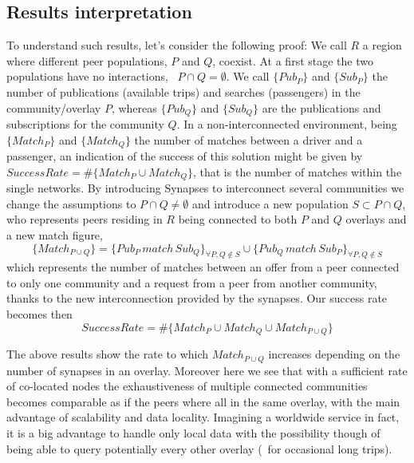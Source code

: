 \subsection{Results interpretation}
%
To understand such results, let's consider the following proof: We
call $R$ a region where different peer populations, $P$ and $Q$,
coexist.  At a first stage the two populations have no interactions,
\ie\ $P \cap Q = \emptyset$.  We call $\{ Pub_{P} \}$ and $\{ Sub_{P}
\}$ the number of publications (available trips) and searches
(passengers) in the community/overlay $P$, whereas $\{ Pub_{Q} \}$ and
$\{ Sub_{Q} \}$ are the publications and subscriptions for the
community $Q$.  In a non-interconnected environment, being $\{
Match_{P} \}$ and $\{ Match_{Q} \}$ the number of matches between a
driver and a passenger, an indication of the success of this solution
might be given by $SuccessRate = \# \{ Match_{P} \cup Match_{Q} \}$,
that is the number of matches within the single networks.  By
introducing Synapses to interconnect several communities we change the
assumptions to $P \cap Q \neq \emptyset$ and introduce a new
population $S \subset P \cap Q$, who represents peers residing in $R$
being connected to both $P$ and $Q$ overlays and a new match
figure, $$\{ Match_{P\cup Q} \}=\{ Pub_{P}\,match\,Sub_{Q} \}_{\forall
P,Q \notin S } \cup \{ Pub_{Q}\,match\,Sub_{P}\}_{\forall P,Q
\notin S}$$ which represents the number of matches between an offer
from a peer connected to only one community and a request from a peer
from another community, thanks to the new interconnection provided by
the synapses.  Our success rate becomes then
$$SuccessRate = \# \{ Match_{P} \cup Match_{Q} \cup Match_{P\cup Q} \}$$

The above results show the rate to which $Match_{P\cup Q}$ increases
depending on the number of synapses in an overlay.  Moreover here we
see that with a sufficient rate of co-located nodes the exhaustiveness
of multiple connected communities becomes comparable as if the peers
where all in the same overlay, with the main advantage of scalability
and data locality.  Imagining a worldwide service in fact, it is a big
advantage to handle only local data with the possibility though of
being able to query potentially every other overlay (\ie\ for
occasional long trips).
 
